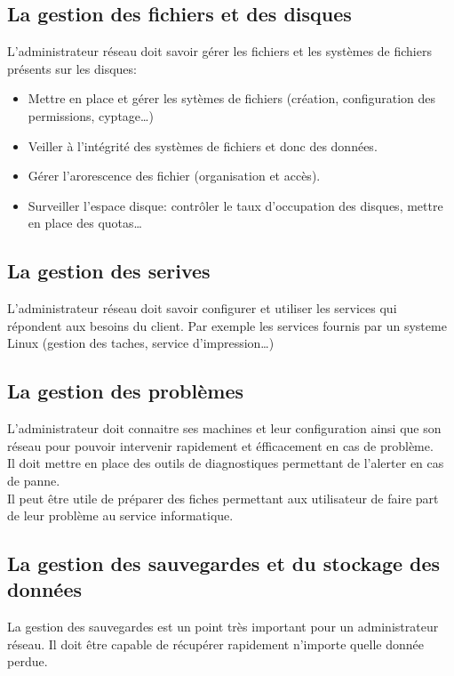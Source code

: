 \documentclass[10pt,a4paper]{article}
\begin{document}
 \subsection{La gestion des fichiers et des disques}
 L'administrateur réseau doit savoir gérer les fichiers et les systèmes de fichiers présents sur les disques:
 \begin{itemize}
	 \item Mettre en place et gérer les sytèmes de fichiers (création, configuration des permissions, cyptage\ldots)
	 \item Veiller à l'intégrité des systèmes de fichiers et donc des données.
	 \item Gérer l'arorescence des fichier (organisation et accès).
	 \item Surveiller l'espace disque: contrôler le taux d'occupation des disques, mettre en place des quotas\ldots
 \end{itemize}

 \subsection{La gestion des serives}
 L'administrateur réseau doit savoir configurer et utiliser les services qui répondent aux besoins du client. Par exemple les services fournis par un systeme Linux (gestion des taches, service d'impression\ldots)

 \subsection{La gestion des problèmes}
 L'administrateur doit connaitre ses machines et leur configuration ainsi que son réseau pour pouvoir intervenir rapidement et éfficacement en cas de problème.\\
 Il doit mettre en place des outils de diagnostiques permettant de l'alerter en cas de panne.\\
 Il peut être utile de préparer des fiches permettant aux utilisateur de faire part de leur problème au service informatique.\\

 \subsection{La gestion des sauvegardes et du stockage des données}
 La gestion des sauvegardes est un point très important pour un administrateur réseau. Il doit être capable de récupérer rapidement n'importe quelle donnée perdue.
\end{document}
